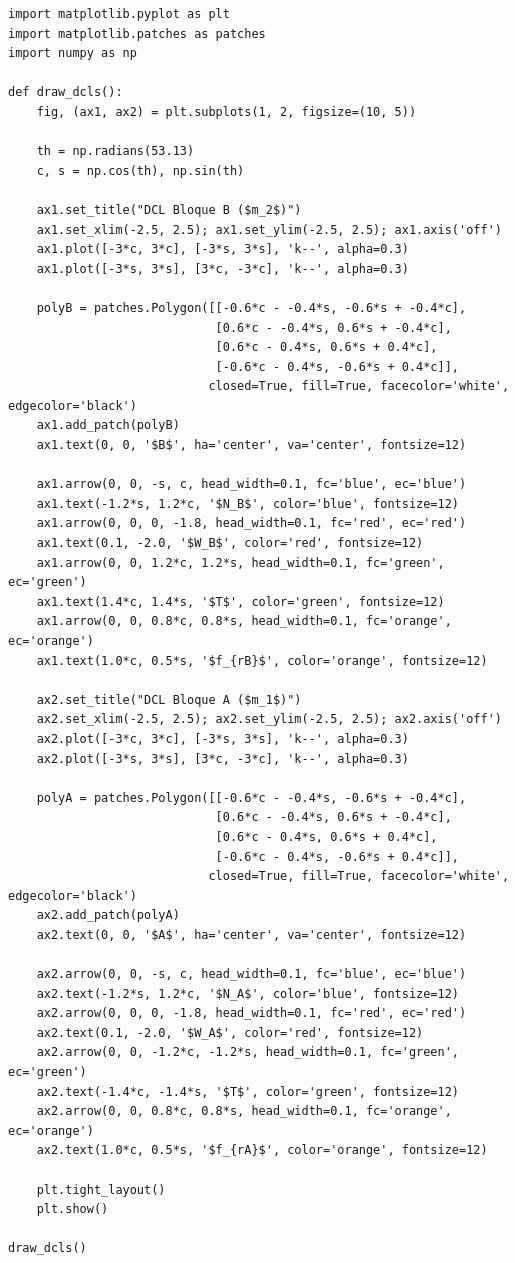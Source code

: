 \documentclass[12pt, a4paper]{article}
\begin{document}
\begin{lstlisting}
import matplotlib.pyplot as plt
import matplotlib.patches as patches
import numpy as np

def draw_dcls():
    fig, (ax1, ax2) = plt.subplots(1, 2, figsize=(10, 5))
    
    th = np.radians(53.13)
    c, s = np.cos(th), np.sin(th)
    
    ax1.set_title("DCL Bloque B ($m_2$)")
    ax1.set_xlim(-2.5, 2.5); ax1.set_ylim(-2.5, 2.5); ax1.axis('off')
    ax1.plot([-3*c, 3*c], [-3*s, 3*s], 'k--', alpha=0.3)
    ax1.plot([-3*s, 3*s], [3*c, -3*c], 'k--', alpha=0.3)
    
    polyB = patches.Polygon([[-0.6*c - -0.4*s, -0.6*s + -0.4*c], 
                             [0.6*c - -0.4*s, 0.6*s + -0.4*c], 
                             [0.6*c - 0.4*s, 0.6*s + 0.4*c], 
                             [-0.6*c - 0.4*s, -0.6*s + 0.4*c]], 
                            closed=True, fill=True, facecolor='white', edgecolor='black')
    ax1.add_patch(polyB)
    ax1.text(0, 0, '$B$', ha='center', va='center', fontsize=12)
    
    ax1.arrow(0, 0, -s, c, head_width=0.1, fc='blue', ec='blue')
    ax1.text(-1.2*s, 1.2*c, '$N_B$', color='blue', fontsize=12)
    ax1.arrow(0, 0, 0, -1.8, head_width=0.1, fc='red', ec='red')
    ax1.text(0.1, -2.0, '$W_B$', color='red', fontsize=12)
    ax1.arrow(0, 0, 1.2*c, 1.2*s, head_width=0.1, fc='green', ec='green')
    ax1.text(1.4*c, 1.4*s, '$T$', color='green', fontsize=12)
    ax1.arrow(0, 0, 0.8*c, 0.8*s, head_width=0.1, fc='orange', ec='orange')
    ax1.text(1.0*c, 0.5*s, '$f_{rB}$', color='orange', fontsize=12)
    
    ax2.set_title("DCL Bloque A ($m_1$)")
    ax2.set_xlim(-2.5, 2.5); ax2.set_ylim(-2.5, 2.5); ax2.axis('off')
    ax2.plot([-3*c, 3*c], [-3*s, 3*s], 'k--', alpha=0.3)
    ax2.plot([-3*s, 3*s], [3*c, -3*c], 'k--', alpha=0.3)
    
    polyA = patches.Polygon([[-0.6*c - -0.4*s, -0.6*s + -0.4*c], 
                             [0.6*c - -0.4*s, 0.6*s + -0.4*c], 
                             [0.6*c - 0.4*s, 0.6*s + 0.4*c], 
                             [-0.6*c - 0.4*s, -0.6*s + 0.4*c]], 
                            closed=True, fill=True, facecolor='white', edgecolor='black')
    ax2.add_patch(polyA)
    ax2.text(0, 0, '$A$', ha='center', va='center', fontsize=12)
    
    ax2.arrow(0, 0, -s, c, head_width=0.1, fc='blue', ec='blue')
    ax2.text(-1.2*s, 1.2*c, '$N_A$', color='blue', fontsize=12)
    ax2.arrow(0, 0, 0, -1.8, head_width=0.1, fc='red', ec='red')
    ax2.text(0.1, -2.0, '$W_A$', color='red', fontsize=12)
    ax2.arrow(0, 0, -1.2*c, -1.2*s, head_width=0.1, fc='green', ec='green')
    ax2.text(-1.4*c, -1.4*s, '$T$', color='green', fontsize=12)
    ax2.arrow(0, 0, 0.8*c, 0.8*s, head_width=0.1, fc='orange', ec='orange')
    ax2.text(1.0*c, 0.5*s, '$f_{rA}$', color='orange', fontsize=12)

    plt.tight_layout()
    plt.show()

draw_dcls()
\end{lstlisting}
\end{document}
